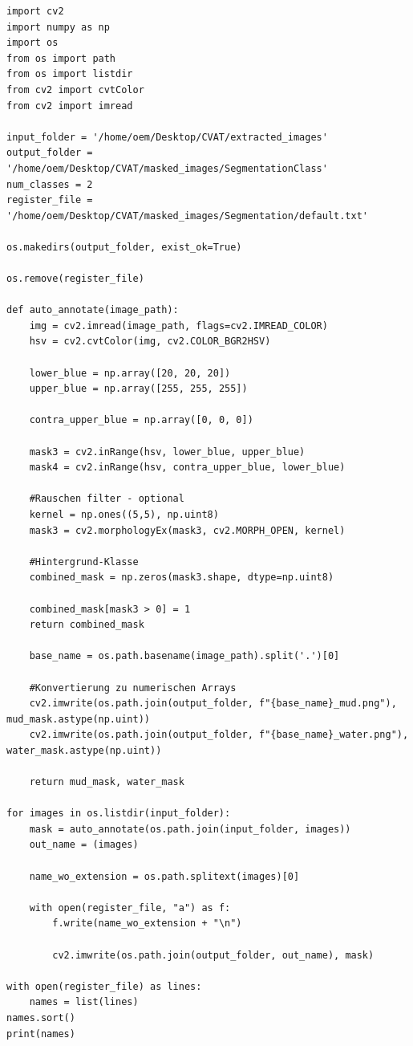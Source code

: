 \begin{lstlisting}[caption=Code zur Maskengenerierung, label=lst:maskgen]
import cv2
import numpy as np
import os
from os import path
from os import listdir
from cv2 import cvtColor
from cv2 import imread

input_folder = '/home/oem/Desktop/CVAT/extracted_images'
output_folder = '/home/oem/Desktop/CVAT/masked_images/SegmentationClass'
num_classes = 2
register_file = '/home/oem/Desktop/CVAT/masked_images/Segmentation/default.txt'

os.makedirs(output_folder, exist_ok=True)

os.remove(register_file)

def auto_annotate(image_path):
    img = cv2.imread(image_path, flags=cv2.IMREAD_COLOR)
    hsv = cv2.cvtColor(img, cv2.COLOR_BGR2HSV)

    lower_blue = np.array([20, 20, 20])
    upper_blue = np.array([255, 255, 255])

    contra_upper_blue = np.array([0, 0, 0])

    mask3 = cv2.inRange(hsv, lower_blue, upper_blue)
    mask4 = cv2.inRange(hsv, contra_upper_blue, lower_blue)

    #Rauschen filter - optional
    kernel = np.ones((5,5), np.uint8)
    mask3 = cv2.morphologyEx(mask3, cv2.MORPH_OPEN, kernel)

    #Hintergrund-Klasse
    combined_mask = np.zeros(mask3.shape, dtype=np.uint8)

    combined_mask[mask3 > 0] = 1
    return combined_mask

    base_name = os.path.basename(image_path).split('.')[0]

    #Konvertierung zu numerischen Arrays
    cv2.imwrite(os.path.join(output_folder, f"{base_name}_mud.png"), mud_mask.astype(np.uint))
    cv2.imwrite(os.path.join(output_folder, f"{base_name}_water.png"), water_mask.astype(np.uint))

    return mud_mask, water_mask

for images in os.listdir(input_folder):
    mask = auto_annotate(os.path.join(input_folder, images))
    out_name = (images)

    name_wo_extension = os.path.splitext(images)[0]

    with open(register_file, "a") as f:
        f.write(name_wo_extension + "\n")

        cv2.imwrite(os.path.join(output_folder, out_name), mask)

with open(register_file) as lines:
    names = list(lines)
names.sort()
print(names)
\end{lstlisting}

